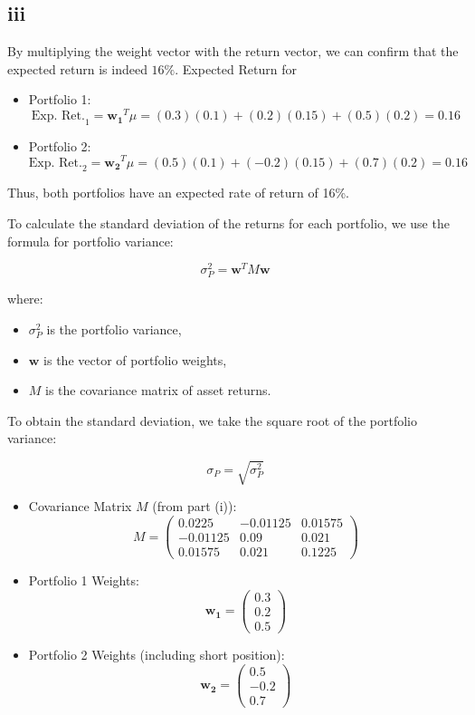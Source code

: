 \documentclass{article}
\begin{document}
\subsection*{iii}
By multiplying the weight vector with the return vector, we can confirm that the expected return is indeed $16\%$.
Expected Return for
\begin{itemize}
    \item Portfolio 1:
          \[
              \text{Exp. Ret.}_1 = \mathbf{w_1}^T \mu = (0.3)(0.1) + (0.2)(0.15) + (0.5)(0.2) = 0.16
          \]

    \item Portfolio 2:
          \[
              \text{Exp. Ret.}_2 = \mathbf{w_2}^T \mu = (0.5)(0.1) + (-0.2)(0.15) + (0.7)(0.2) = 0.16
          \]
\end{itemize}

Thus, both portfolios have an expected rate of return of 16\%.

To calculate the standard deviation of the returns for each portfolio, we use the formula for portfolio variance:

\[
    \sigma_P^2 = \mathbf{w}^T M \mathbf{w}
\]

where:
\begin{itemize}
    \item \( \sigma_P^2 \) is the portfolio variance,
    \item \( \mathbf{w} \) is the vector of portfolio weights,
    \item \( M \) is the covariance matrix of asset returns.
\end{itemize}

To obtain the standard deviation, we take the square root of the portfolio variance:

\[
    \sigma_P = \sqrt{\sigma_P^2}
\]

\begin{itemize}
    \item Covariance Matrix \( M \) (from part (i)):
          \[
              M = \begin{pmatrix}
                  0.0225   & -0.01125 & 0.01575 \\
                  -0.01125 & 0.09     & 0.021   \\
                  0.01575  & 0.021    & 0.1225
              \end{pmatrix}
          \]

    \item Portfolio 1 Weights:
          \[
              \mathbf{w_1} = \begin{pmatrix} 0.3 \\ 0.2 \\ 0.5 \end{pmatrix}
          \]

    \item Portfolio 2 Weights (including short position):
          \[
              \mathbf{w_2} = \begin{pmatrix} 0.5 \\ -0.2 \\ 0.7 \end{pmatrix}
          \]
\end{itemize}
\end{document}
